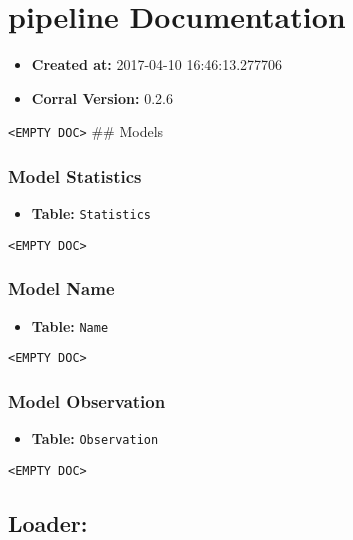 \section{pipeline Documentation}\label{pipeline-documentation}

\begin{itemize}
\tightlist
\item
  \textbf{Created at:} 2017-04-10 16:46:13.277706
\item
  \textbf{Corral Version:} 0.2.6
\end{itemize}

\texttt{\textless{}EMPTY\ DOC\textgreater{}} \#\# Models

\subsubsection{\texorpdfstring{Model
\textbf{Statistics}}{Model Statistics}}\label{model-statistics}

\begin{itemize}
\tightlist
\item
  \textbf{Table:} \texttt{Statistics}
\end{itemize}

\texttt{\textless{}EMPTY\ DOC\textgreater{}}

\subsubsection{\texorpdfstring{Model
\textbf{Name}}{Model Name}}\label{model-name}

\begin{itemize}
\tightlist
\item
  \textbf{Table:} \texttt{Name}
\end{itemize}

\texttt{\textless{}EMPTY\ DOC\textgreater{}}

\subsubsection{\texorpdfstring{Model
\textbf{Observation}}{Model Observation}}\label{model-observation}

\begin{itemize}
\tightlist
\item
  \textbf{Table:} \texttt{Observation}
\end{itemize}

\texttt{\textless{}EMPTY\ DOC\textgreater{}}

\subsection{Loader:}\label{loader}


